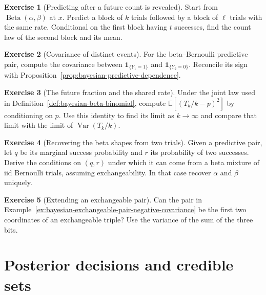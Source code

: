 \documentclass[11pt,oneside]{book}
\theoremstyle{definition}
\newtheorem{exercise}{Exercise}[section]
\theoremstyle{remark}
\begin{document}
\begin{exercise}[Predicting after a future count is revealed]
\label{exer:bayesian-predictive-after-count}
Start from $\operatorname{Beta}(\alpha,\beta)$ at $x$.
Predict a block of $k$ trials followed by a block of $\ell$ trials
with the same rate. Conditional on the first block having $t$
successes, find the count law of the second block and its mean.
\end{exercise}

\begin{exercise}[Covariance of distinct events]
\label{exer:bayesian-predictive-cross-event}
For the beta--Bernoulli predictive pair, compute the covariance
between $\mathbf 1_{\{Y_1=1\}}$ and $\mathbf 1_{\{Y_2=0\}}$.
Reconcile its sign with Proposition~\ref{prop:bayesian-predictive-dependence}.
\end{exercise}

\begin{exercise}[The future fraction and the shared rate]
\label{exer:bayesian-predictive-future-fraction}
Under the joint law used in Definition~\ref{def:bayesian-beta-binomial},
compute $\mathbb E[(T_k/k-p)^2]$ by conditioning on $p$.
Use this identity to find its limit as $k\to\infty$ and compare
that limit with the limit of $\operatorname{Var}(T_k/k)$.
\end{exercise}

\begin{exercise}[Recovering the beta shapes from two trials]
\label{exer:bayesian-predictive-identify-beta}
Given a predictive pair, let $q$ be its marginal success probability
and $r$ its probability of two successes. Derive the conditions
on $(q,r)$ under which it can come from a beta mixture of iid
Bernoulli trials, assuming exchangeability. In that case recover
$\alpha$ and $\beta$ uniquely.
\end{exercise}

\begin{exercise}[Extending an exchangeable pair]
\label{exer:bayesian-exchangeable-pair-extension}
Can the pair in Example~\ref{ex:bayesian-exchangeable-pair-negative-covariance}
be the first two coordinates of an exchangeable triple? Use the
variance of the sum of the three bits.
\end{exercise}

\section{Posterior decisions and credible sets}
\label{sec:bayesian-decisions-and-credible-sets}
\end{document}
